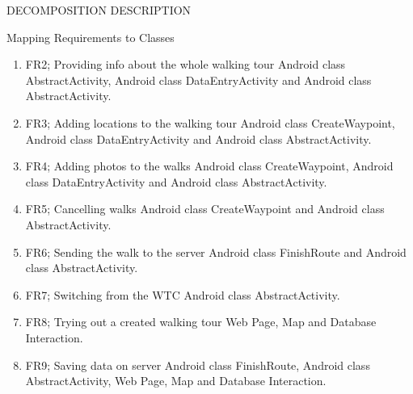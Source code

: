 \documentclass{article}
\begin{document}
\begin{section}{DECOMPOSITION DESCRIPTION}
\begin{subsection}{Mapping Requirements to Classes}
\begin{enumerate}
		    \item{FR2; Providing info about the whole walking tour}
		    Android class AbstractActivity, Android class DataEntryActivity
		    and Android class AbstractActivity.

		    \item{FR3; Adding locations to the walking tour}
		    Android class CreateWaypoint, Android class DataEntryActivity
		    and Android class AbstractActivity.

		    \item{FR4; Adding photos to the walks}
		    Android class CreateWaypoint, Android class DataEntryActivity 
		    and Android class AbstractActivity.

		    \item{FR5; Cancelling walks}
		    Android class CreateWaypoint and Android class AbstractActivity.

		    \item{FR6; Sending the walk to the server}
		    Android class FinishRoute and Android class AbstractActivity.

		    \item{FR7; Switching from the WTC}
		    Android class AbstractActivity.

		    \item{FR8; Trying out a created walking tour}
		    Web Page, Map and Database Interaction.

		    \item{FR9; Saving data on server}
		    Android class FinishRoute, Android class AbstractActivity, Web Page, Map and Database Interaction.
        \end{enumerate}
	\end{subsection}
\end{section}
\end{document}
